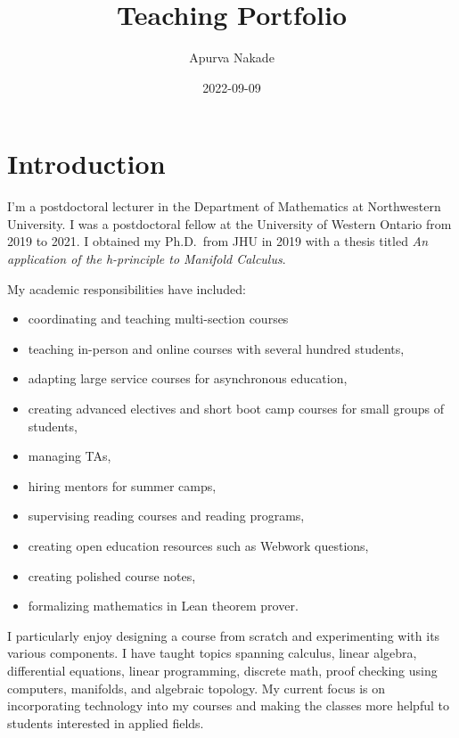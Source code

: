 \documentclass[
]{report}
\title{Teaching Portfolio}
\author{Apurva Nakade}
\date{2022-09-09}
\providecommand{\tightlist}{%
  \setlength{\itemsep}{0pt}\setlength{\parskip}{0pt}}
\begin{document}
\maketitle

\thispagestyle{empty}

{
\setcounter{tocdepth}{2}
\tableofcontents
}
\hypertarget{introduction}{%
\chapter*{Introduction}\label{introduction}}


I'm a postdoctoral lecturer in the Department of Mathematics at Northwestern
University. I was a postdoctoral fellow at the University of Western
Ontario from 2019 to 2021. I obtained my Ph.D.~from JHU in 2019 with a thesis titled \emph{An application of
the h-principle to Manifold Calculus}.

My academic responsibilities have included:

\begin{itemize}
\tightlist
\item
  coordinating and teaching multi-section courses
\item
  teaching in-person and online courses with several hundred students,
\item
  adapting large service courses for asynchronous education,
\item
  creating advanced electives and short boot camp courses for small groups of students,
\item
  managing TAs,
\item
  hiring mentors for summer camps,
\item
  supervising reading courses and reading programs,
\item
  creating open education resources such as Webwork questions,
\item
  creating polished course notes,
\item
  formalizing mathematics in Lean theorem prover.
\end{itemize}

I particularly enjoy designing a course from scratch and experimenting with its various components.
I have taught topics spanning calculus, linear algebra, differential equations, linear programming, discrete math, proof checking using computers, manifolds, and algebraic topology.
My current focus is on incorporating technology into my courses and making the classes more helpful to students interested in applied fields.
\end{document}
